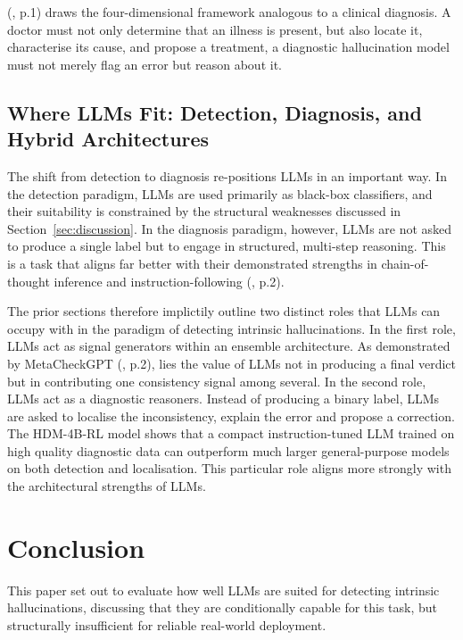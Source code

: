 \documentclass[
  seminar,   	 
  english,   	 
  titlepage=on,
  captions=tableheadings
]{ttlab-qualify}
\begin{document}
(\cite{liu2025detection}, p.1) draws the four-dimensional framework analogous to a clinical diagnosis. A doctor must not only determine that an illness is present, but also locate it, characterise its cause, and propose a treatment, a diagnostic hallucination model must not merely flag an error but reason about it.

\subsection{Where LLMs Fit: Detection, Diagnosis, and Hybrid Architectures}

The shift from detection to diagnosis re-positions LLMs in an important way. In the detection paradigm, LLMs are used primarily as black-box classifiers, and their suitability is constrained by the structural weaknesses discussed in Section~\ref{sec:discussion}. In the diagnosis paradigm, however, LLMs are not asked to produce a single label but to engage in structured, multi-step reasoning. This is a task that aligns far better with their demonstrated strengths in chain-of-thought inference and instruction-following (\cite{liu2025detection}, p.2).

The prior sections therefore implictily outline two distinct roles that LLMs can occupy with in the paradigm of detecting intrinsic hallucinations. In the first role, LLMs act as signal generators within an ensemble architecture. As demonstrated by MetaCheckGPT (\cite{mehta2024metacheckgpt}, p.2), lies the value of LLMs not in producing a final verdict but in contributing one consistency signal among several. In the second role, LLMs act as a diagnostic reasoners. Instead of producing a binary label, LLMs are asked to localise the inconsistency, explain the error and propose a correction. The HDM-4B-RL model shows that a compact instruction-tuned LLM trained on high quality diagnostic data can outperform much larger general-purpose models on both detection and localisation. This particular role aligns more strongly with the architectural strengths of LLMs.



\section{Conclusion}
This paper set out to evaluate how well LLMs are suited for detecting intrinsic hallucinations, discussing that they are conditionally capable for this task, but structurally insufficient for reliable real-world deployment.
\end{document}
